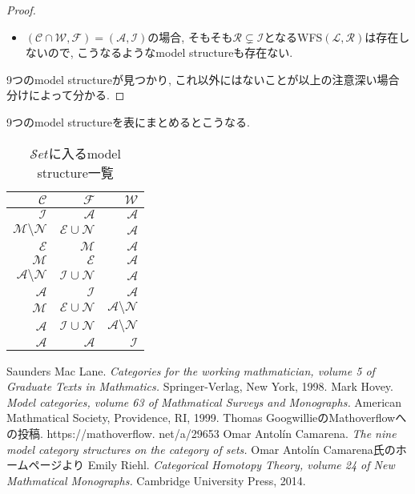 \documentclass[. /main]{subfiles}
\theoremstyle{definition}
\begin{document}
\begin{proof}
\begin{itemize}
\item $(\mathcal{C} \cap \mathcal{W},  \mathcal{F})=(\mathcal{A},  \mathcal{I})$の場合, そもそも$\mathcal{R} \subsetneq \mathcal{I}$となるWFS$(\mathcal{L},  \mathcal{R})$は存在しないので, こうなるようなmodel structureも存在ない. 
\end{itemize}
9つのmodel structureが見つかり, これ以外にはないことが以上の注意深い場合分けによって分かる. 
\end{proof}
9つのmodel structureを表にまとめるとこうなる. 
\begin{table}[hbtp]
\caption{$\mathcal{S}et$に入るmodel structure一覧}
\centering
\begin{tabular}{rrr}
\hline
$\mathcal{C}$& $\mathcal{F}$& $\mathcal{W}$\\
\hline \hline
$\mathcal{I}$& $\mathcal{A}$& $\mathcal{A}$\\
$\mathcal{M} \setminus \mathcal{N}$& $\mathcal{E} \cup \mathcal{N}$& $\mathcal{A}$\\
$\mathcal{E}$& $\mathcal{M}$& $\mathcal{A}$\\
$\mathcal{M}$& $\mathcal{E}$& $\mathcal{A}$\\
$\mathcal{A} \setminus \mathcal{N}$& $\mathcal{I} \cup \mathcal{N}$& $\mathcal{A}$\\
$\mathcal{A}$& $\mathcal{I}$& $\mathcal{A}$\\
$\mathcal{M}$& $\mathcal{E} \cup \mathcal{N}$& $\mathcal{A} \setminus \mathcal{N}$\\
$\mathcal{A}$& $\mathcal{I} \cup \mathcal{N}$& $\mathcal{A} \setminus \mathcal{N}$\\
$\mathcal{A}$& $\mathcal{A}$& $\mathcal{I}$\\
\hline
\end{tabular}
\end{table}

\begin{thebibliography}{9}
 Saunders Mac Lane.  
{\it Categories for the working mathmatician,  volume 5 of Graduate Texts in Mathmatics.}  Springer-Verlag,  New York,  1998. 
 Mark Hovey. 
{\it Model categories,  volume 63 of Mathmatical Surveys and Monographs.}  American Mathmatical Society,  Providence,  RI,  1999. 
 Thomas GoogwillieのMathoverflowへの投稿.  
https://mathoverflow. net/a/29653
 Omar Antolín Camarena. 
{\it The nine model category structures on the category of sets. } Omar Antolín Camarena氏のホームページより
 Emily Riehl. 
{\it Categorical Homotopy Theory,  volume 24 of New Mathmatical Monographs.}  Cambridge University Press,  2014. 

\end{thebibliography}
\end{document}
